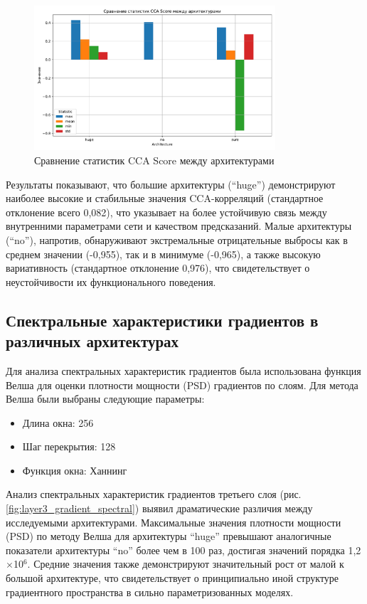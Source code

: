 \documentclass[a4paper,12pt]{article}
\begin{document}
\begin{figure}[ht]
  \centering
  \includegraphics[width=0.8\textwidth]{cca_score_statistics_comparison.pdf}
  \caption{Сравнение статистик CCA Score между архитектурами}
  \label{fig:cca_score_comparison}
\end{figure}

Результаты показывают, что большие архитектуры (``huge'') демонстрируют наиболее высокие и стабильные
значения CCA-корреляций (стандартное отклонение всего 0,082), что указывает на более устойчивую связь между
внутренними параметрами сети и качеством предсказаний. Малые архитектуры (``no''), напротив, обнаруживают
экстремальные отрицательные выбросы как в среднем значении (-0,955), так и в минимуме (-0,965), а также
высокую вариативность (стандартное отклонение 0,976), что свидетельствует о неустойчивости их функционального поведения.

\subsection{Спектральные характеристики градиентов в различных архитектурах}

Для анализа спектральных характеристик градиентов была использована функция Велша для оценки плотности
мощности (PSD) градиентов по слоям. Для метода Велша были выбраны следующие
параметры:
\begin{itemize}
  \item Длина окна: 256
  \item Шаг перекрытия: 128
  \item Функция окна: Ханнинг
\end{itemize}

Анализ спектральных характеристик градиентов третьего слоя (рис. \ref{fig:layer3_gradient_spectral}) выявил
драматические различия между исследуемыми архитектурами. Максимальные значения плотности
мощности (PSD) по методу Велша для архитектуры ``huge'' превышают аналогичные показатели архитектуры ``no''
более чем в 100 раз, достигая значений порядка 1,2$\times$10$^6$. Средние значения также демонстрируют
значительный рост от малой к большой архитектуре, что свидетельствует о принципиально иной структуре
градиентного пространства в сильно параметризованных моделях.
\end{document}
